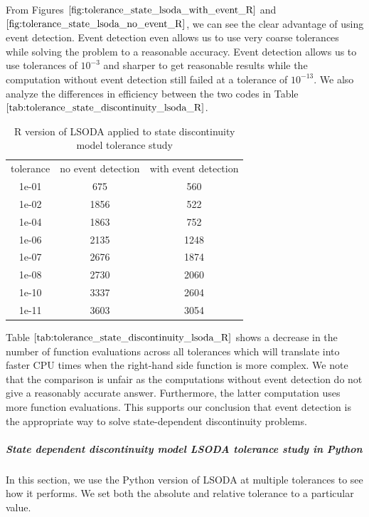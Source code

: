 From Figures $\ref{fig:tolerance_state_lsoda_with_event_R}$ and $\ref{fig:tolerance_state_lsoda_no_event_R}$, we can see the clear advantage of using event detection. Event detection even allows us to use very coarse tolerances while solving the problem to a reasonable accuracy. Event detection allows us to use tolerances of $10^{-3}$ and sharper to get reasonable results while the computation without event detection still failed at a tolerance of $10^{-13}$. We also analyze the differences in efficiency between the two codes in Table $\ref{tab:tolerance_state_discontinuity_lsoda_R}$.

\begin{table}[h]
\caption {R version of LSODA applied to state discontinuity model tolerance study} \label{tab:tolerance_state_discontinuity_lsoda_R} 
\begin{center}
\begin{tabular}{ c c c }
tolerance & no event detection & with event detection \\
1e-01 & 675 & 560 \\
1e-02 & 1856 & 522 \\
1e-04 & 1863 & 752 \\
1e-06 & 2135 & 1248 \\
1e-07 & 2676 & 1874 \\
1e-08 & 2730 & 2060 \\
1e-10 & 3337 & 2604 \\
1e-11 & 3603 & 3054 \\
\end{tabular}
\end{center}
\end{table}

Table $\ref{tab:tolerance_state_discontinuity_lsoda_R}$ shows a decrease in the number of function evaluations across all tolerances which will translate into faster CPU times when the right-hand side function is more complex. We note that the comparison is unfair as the computations without event detection do not give a reasonably accurate answer. Furthermore, the latter computation uses more function evaluations. This supports our conclusion that event detection is the appropriate way to solve state-dependent discontinuity problems.

\subparagraph{State dependent discontinuity model LSODA tolerance study in Python}
In this section, we use the Python version of LSODA at multiple tolerances to see how it performs. We set both the absolute and relative tolerance to a particular value. 

